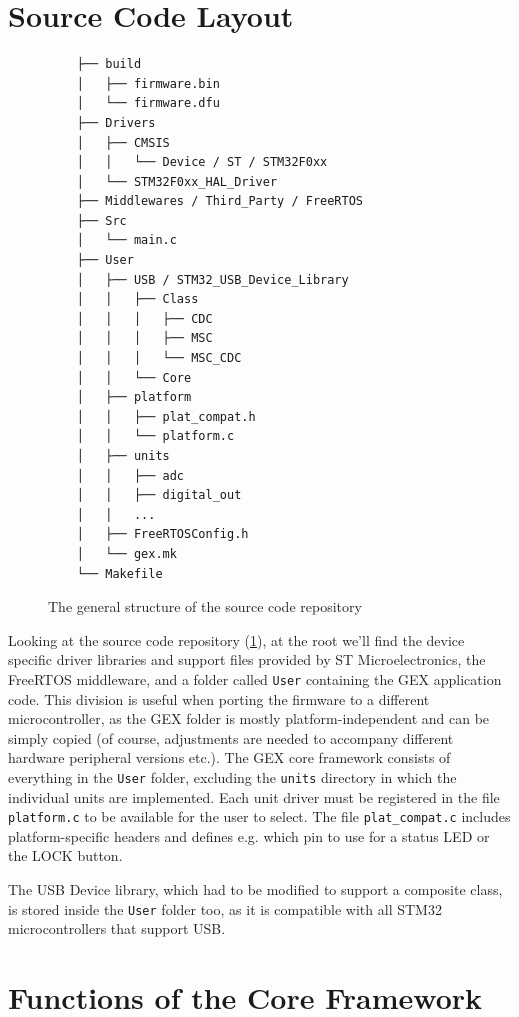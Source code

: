 \section{Source Code Layout}

\begin{figure}
	\scriptsize\vspace{-3em}
	\begin{verbatim}
	├── build
	│   ├── firmware.bin
	│   └── firmware.dfu
	├── Drivers
	│   ├── CMSIS
	│   │   └── Device / ST / STM32F0xx
	│   └── STM32F0xx_HAL_Driver
	├── Middlewares / Third_Party / FreeRTOS
	├── Src
	│   └── main.c
	├── User
	│   ├── USB / STM32_USB_Device_Library
	│   │   ├── Class
	│   │   │   ├── CDC
	│   │   │   ├── MSC
	│   │   │   └── MSC_CDC
	│   │   └── Core
	│   ├── platform
	│   │   ├── plat_compat.h
	│   │   └── platform.c
	│   ├── units
	│   │   ├── adc
	│   │   ├── digital_out
	│   │   ...
	│   ├── FreeRTOSConfig.h
	│   └── gex.mk
	└── Makefile
	\end{verbatim}
	\vspace{-1em}
	\caption{\label{fig:repo-structure} The general structure of the source code repository}
\end{figure}

Looking at the source code repository (\cref{fig:repo-structure}), at the root we'll find the device specific driver libraries and support files provided by ST Microelectronics, the FreeRTOS middleware, and a folder called \verb|User| containing the GEX application code. This division is useful when porting the firmware to a different microcontroller, as the GEX folder is mostly platform-independent and can be simply copied (of course, adjustments are needed to accompany different hardware peripheral versions etc.). The GEX core framework consists of everything in the \verb|User| folder, excluding the \verb|units| directory in which the individual units are implemented. Each unit driver must be registered in the file \verb|platform.c| to be available for the user to select. The file \verb|plat_compat.c| includes platform-specific headers and defines e.g. which pin to use for a status \gls{LED} or the LOCK button.

The \gls{USB} Device library, which had to be modified to support a composite class, is stored inside the \verb|User| folder too, as it is compatible with all STM32 microcontrollers that support \gls{USB}.


\section{Functions of the Core Framework}

